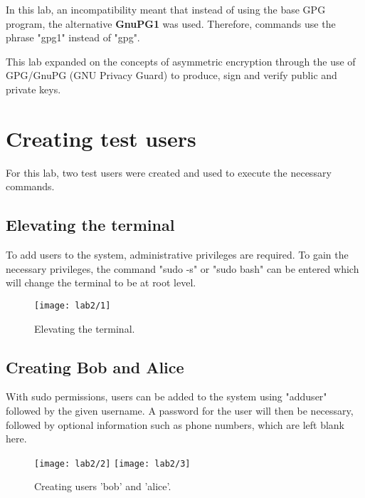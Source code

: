 \begin{tcolorbox}[colback=red!5!white,colframe=red!75!black,title=Important note]
    In this lab, an incompatibility meant that instead
    of using the base GPG program, the alternative \textbf{GnuPG1} was used.
    Therefore, commands use the phrase "gpg1" instead of "gpg".
\end{tcolorbox}

This lab expanded on the concepts of asymmetric encryption through the use of\newline
GPG/GnuPG (GNU Privacy Guard) to produce, sign and verify public and private keys.\\

\section{Creating test users}\label{sec:testUsers}
For this lab, two test users were created and used to execute the necessary commands.

\subsection{Elevating the terminal}\label{subsec:sudo}
To add users to the system, administrative privileges are required.
To gain the necessary privileges, the command "sudo -s" or "sudo bash" can be entered
which will change the terminal to be at root level.

\begin{figure}[H]
    \centering
    \texttt{[image: lab2/1]}
    \caption{Elevating the terminal.}
    \label{fig:sudo}
\end{figure}

\subsection{Creating Bob and Alice}\label{subsec:createUsers}
With sudo permissions, users can be added to the system using "adduser" followed by the given username.
A password for the user will then be necessary, followed by optional information such as phone
numbers, which are left blank here.

\begin{figure}[H]
    \centering
    \texttt{[image: lab2/2]}
    \texttt{[image: lab2/3]}
    \caption{Creating users 'bob' and 'alice'.}
    \label{fig:createBob}
\end{figure}

